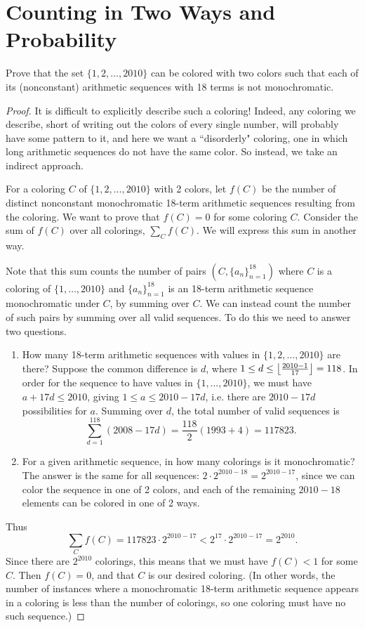 \section{Counting in Two Ways and Probability}
\begin{ex}
Prove that the set $\{1,2,\ldots, 2010\}$ can be colored with two colors such that each of its (nonconstant) arithmetic sequences with 18 terms is not monochromatic.
\end{ex}
\begin{proof}
It is difficult to explicitly describe such a coloring! Indeed, any coloring we describe, short of writing out the colors of every single number, will probably have some pattern to it, and here we want a ``disorderly" coloring, one in which long arithmetic sequences do not have the same color. So instead, we take an indirect approach.

For a coloring $C$ of $\{1,2,\ldots, 2010\}$ with 2 colors, let $f(C)$ be the number of distinct nonconstant monochromatic 18-term arithmetic sequences resulting from the coloring. We want to prove that $f(C)=0$ for some coloring $C$. Consider the sum of $f(C)$ over all colorings, $\sum_C f(C)$. We will express this sum in another way.

Note that this sum counts the number of pairs $(C, \{a_n\}_{n=1}^{18})$ where $C$ is a coloring of $\{1,\ldots, 2010\}$ and $\{a_n\}_{n=1}^{18}$ is an 18-term arithmetic sequence monochromatic under $C$, by summing over $C$. We can instead count the number of such pairs by summing over all valid sequences. To do this we need to answer two questions.
\begin{enumerate}
\item How many 18-term arithmetic sequences with values in $\{1,2,\ldots, 2010\}$ are there? Suppose the common difference is $d$, where $1\leq d\leq \left\lfloor {\frac{2010-1}{17}}\right\rfloor=118$. In order for the sequence to have values in $\{1,\ldots, 2010\}$, we must have $a+17d\leq 2010$, giving $1\leq a\leq 2010-17d$, i.e. there are $2010-17d$ possibilities for $a$. Summing over $d$, the total number of valid sequences is
\[\sum_{d=1}^{118} (2008-17d)=\frac{118}{2}(1993+4)=117823.\]
\item For a given arithmetic sequence, in how many colorings is it monochromatic? The answer is the same for all sequences: $2\cdot 2^{2010-18}=2^{2010-17}$, since we can color the sequence in one of 2 colors, and each of the remaining $2010-18$ elements can be colored in one of 2 ways.
\end{enumerate}
Thus
\[\sum_C f(C)=117823\cdot 2^{2010-17}< 2^{17}\cdot 2^{2010-17}=2^{2010}.\]
Since there are $2^{2010}$ colorings, this means that we must have $f(C)<1$ for some $C$. Then $f(C)=0$, and that $C$ is our desired coloring. (In other words, the number of instances where a monochromatic 18-term arithmetic sequence appears in a coloring is less than the number of colorings, so one coloring must have no such sequence.)
\end{proof}

